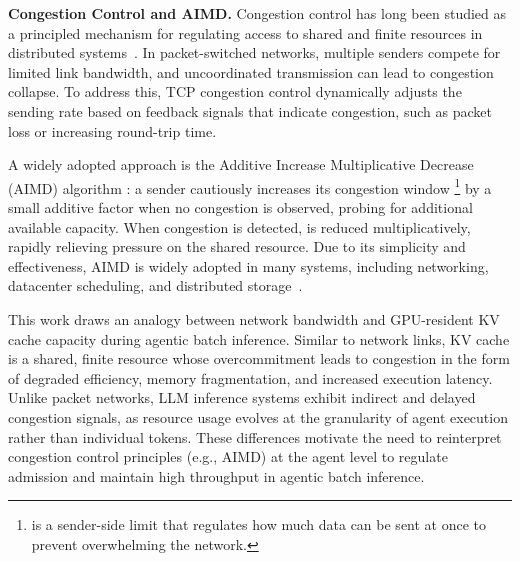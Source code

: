 


\noindent\textbf{Congestion Control and AIMD.}
Congestion control has long been studied as a principled mechanism for regulating access to shared and finite resources in distributed systems~\cite{congestion_control}.
In packet-switched networks, multiple senders compete for limited link bandwidth, and uncoordinated transmission can lead to congestion collapse.
To address this, TCP congestion control dynamically adjusts the sending rate based on feedback signals that indicate congestion, such as packet loss or increasing round-trip time.

A widely adopted approach is the Additive Increase Multiplicative Decrease (AIMD) algorithm \cite{chiu1989analysis, AIMD1}:
a sender cautiously increases its congestion window \cwnd\footnote{\cwnd is a sender-side limit that regulates how much data can be sent at once to prevent overwhelming the network.} by a small additive factor when no congestion is observed, probing for additional available capacity.
When congestion is detected, \cwnd is reduced multiplicatively, rapidly relieving pressure on the shared resource.
Due to its simplicity and effectiveness, AIMD is widely adopted in many systems, including networking, datacenter scheduling, and distributed storage~\cite{tcp}.

This work draws an analogy between network bandwidth and GPU-resident KV cache capacity during agentic batch inference.
Similar to network links, KV cache is a shared, finite resource whose overcommitment leads to congestion in the form of degraded efficiency, memory fragmentation, and increased execution latency.
Unlike packet networks, LLM inference systems exhibit indirect and delayed congestion signals, as resource usage evolves at the granularity of agent execution rather than individual tokens.
These differences motivate the need to reinterpret congestion control principles (e.g., AIMD) at the agent level to regulate admission and maintain high throughput in agentic batch inference.

